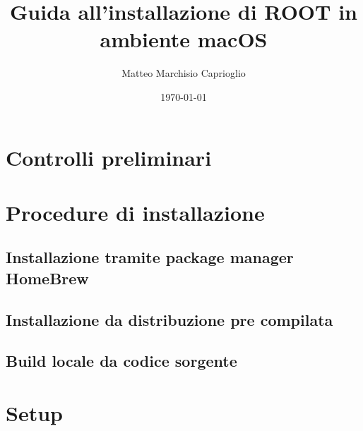 \documentclass[12pt,a4paper]{article}
\title{Guida all'installazione di ROOT in ambiente macOS}
\author{Matteo Marchisio Caprioglio}
\date{\today}
\begin{document}
\maketitle
\newpage

\begin{abstract}
	
\end{abstract}

\newpage

\tableofcontents

\newpage

\section{Controlli preliminari}
\label{sec:prelim}


\section{Procedure di installazione}
\label{sec:install}

\subsection{Installazione tramite package manager HomeBrew}
\label{sec:brew}


\subsection{Installazione da distribuzione pre compilata}
\label{sec:pre-comp}


\subsection{Build locale da codice sorgente}
\label{sec:build}


\section{Setup}
\label{sec:setup}



\newpage
\end{document}
